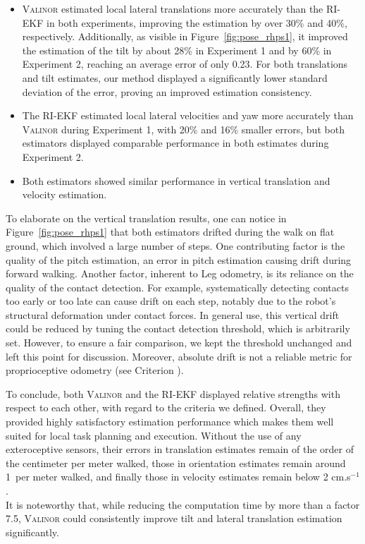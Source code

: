 \documentclass{IJCAS}
\newcommand{\critnum}[1]{\tikz[baseline=(char.base)]{
            \node[shape=circle,draw,inner sep=1pt](char){\textbf{#1}};}}
\begin{document}
\begin{itemize}[leftmargin=0em]
    \item {\scshape Valinor} estimated local lateral translations {\footnotesize\critnum{3}} more accurately than the RI-EKF in both experiments, improving the estimation by over 30\% and 40\%, respectively. Additionally, as visible in Figure~\ref{fig:pose_rhps1}, it improved the estimation of the tilt {\footnotesize\critnum{2}} by about 28\% in Experiment 1 and by 60\% in Experiment 2, reaching an average error of only 0.23\textdegree. For both translations and tilt estimates, our method displayed a significantly lower standard deviation of the error, proving an improved estimation consistency. 
    \item The RI-EKF estimated local lateral velocities {\footnotesize\critnum{2}} and yaw {\footnotesize\critnum{3}} more accurately than {\scshape Valinor} during Experiment 1, with 20\% and 16\% smaller errors, but both estimators displayed comparable performance in both estimates during Experiment 2.
    \item Both estimators showed similar performance in vertical translation {\footnotesize\critnum{3}} and velocity estimation. 
\end{itemize}
To elaborate on the vertical translation results, one can notice in Figure~\ref{fig:pose_rhps1} that both estimators drifted during the walk on flat ground, which involved a large number of steps. One contributing factor is the quality of the pitch estimation, an error in pitch estimation causing drift during forward walking. Another factor, inherent to Leg odometry, is its reliance on the quality of the contact detection. For example, systematically detecting contacts too early or too late can cause drift on each step, notably due to the robot's structural deformation under contact forces. In general use, this vertical drift could be reduced by tuning the contact detection threshold, which is arbitrarily set. However, to ensure a fair comparison, we kept the threshold unchanged and left this point for discussion. Moreover, absolute drift is not a reliable metric for proprioceptive odometry (see Criterion \critnum{3}).

To conclude, both {\scshape Valinor} and the RI-EKF displayed relative strengths with respect to each other, with regard to the criteria we defined. Overall, they provided highly satisfactory estimation performance which makes them well suited for local task planning and execution. Without the use of any exteroceptive sensors, their errors in translation estimates remain of the order of the centimeter per meter walked, those in orientation estimates remain around 1\textdegree \ per meter walked, and finally those in velocity estimates remain below 2 cm.s$^{-1}$. \\
It is noteworthy that, while reducing the computation time by more than a factor 7.5, {\scshape Valinor} could consistently improve tilt and lateral translation estimation significantly.
\end{document}
